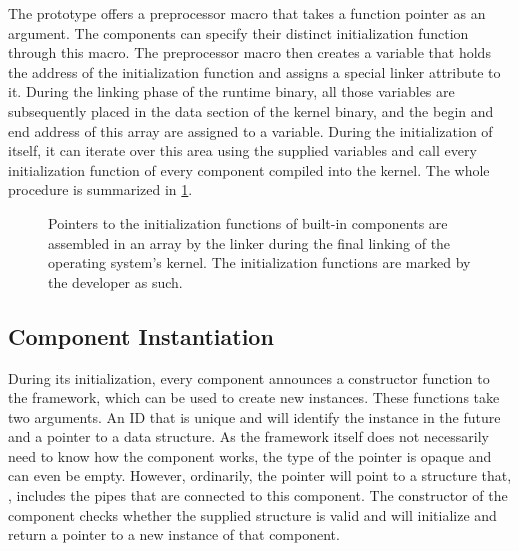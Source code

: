 The \cobas{} prototype offers a preprocessor macro that takes a function pointer as an argument. The components can specify their distinct initialization function through this macro. The preprocessor macro then creates a variable that holds the address of the initialization function and assigns a special linker attribute to it. During the linking phase of the runtime binary, all those variables are subsequently placed in the data section of the kernel binary, and the begin and end address of this array are assigned to a variable. During the initialization of \cobas{} itself, it can iterate over this area using the supplied variables and call every initialization function of every component compiled into the kernel. The whole procedure is summarized in \cref{fig:impl:init}.

\begin{figure}[t!]\centering
	\caption[Assembly of the array of built-in component's initialization functions.]{Pointers to the initialization functions of built-in components are assembled in an array by the linker during the final linking of the operating system's kernel. The initialization functions are marked by the developer as such.}%
	\label{fig:impl:init}
\end{figure}

\subsection{Component Instantiation}

During its initialization, every component announces a constructor function to the \cobas{} framework, which can be used to create new instances. These functions take two arguments. An ID that is unique and will identify the instance in the future and a pointer to a data structure. As the framework itself does not necessarily need to know how the component works, the type of the pointer is opaque and can even be empty. However, ordinarily, the pointer will point to a structure that, \eg{}, includes the pipes that are connected to this component. The constructor of the component checks whether the supplied structure is valid and will initialize and return a pointer to a new instance of that component.
